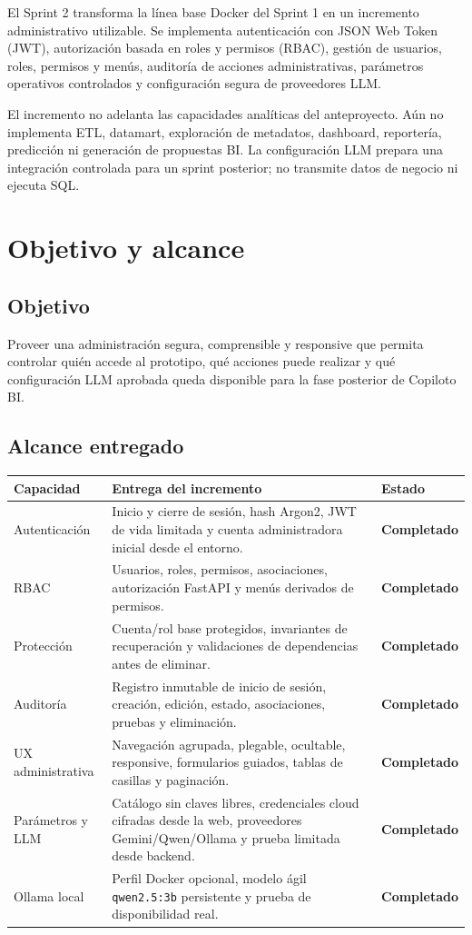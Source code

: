 \documentclass[11pt,letterpaper]{article}
\newcommand{\file}[1]{\texttt{#1}}
\newcommand{\statusok}{\textcolor{success}{\textbf{Completado}}}
\begin{document}
El Sprint 2 transforma la línea base Docker del Sprint 1 en un incremento administrativo utilizable. Se implementa autenticación con JSON Web Token (JWT), autorización basada en roles y permisos (RBAC), gestión de usuarios, roles, permisos y menús, auditoría de acciones administrativas, parámetros operativos controlados y configuración segura de proveedores LLM.

El incremento no adelanta las capacidades analíticas del anteproyecto. Aún no implementa ETL, datamart, exploración de metadatos, dashboard, reportería, predicción ni generación de propuestas BI. La configuración LLM prepara una integración controlada para un sprint posterior; no transmite datos de negocio ni ejecuta SQL.

\section{Objetivo y alcance}

\subsection{Objetivo}

Proveer una administración segura, comprensible y responsive que permita controlar quién accede al prototipo, qué acciones puede realizar y qué configuración LLM aprobada queda disponible para la fase posterior de Copiloto BI.

\subsection{Alcance entregado}

\begin{tabularx}{\textwidth}{@{}p{}X p{}@{}}
  \toprule
  Capacidad & Entrega del incremento & Estado \\
  \midrule
  Autenticación & Inicio y cierre de sesión, hash Argon2, JWT de vida limitada y cuenta administradora inicial desde el entorno. & \statusok \\
  RBAC & Usuarios, roles, permisos, asociaciones, autorización FastAPI y menús derivados de permisos. & \statusok \\
  Protección & Cuenta/rol base protegidos, invariantes de recuperación y validaciones de dependencias antes de eliminar. & \statusok \\
  Auditoría & Registro inmutable de inicio de sesión, creación, edición, estado, asociaciones, pruebas y eliminación. & \statusok \\
  UX administrativa & Navegación agrupada, plegable, ocultable, responsive, formularios guiados, tablas de casillas y paginación. & \statusok \\
  Parámetros y LLM & Catálogo sin claves libres, credenciales cloud cifradas desde la web, proveedores Gemini/Qwen/Ollama y prueba limitada desde backend. & \statusok \\
  Ollama local & Perfil Docker opcional, modelo ágil \file{qwen2.5:3b} persistente y prueba de disponibilidad real. & \statusok \\
  \bottomrule
\end{tabularx}
\end{document}
